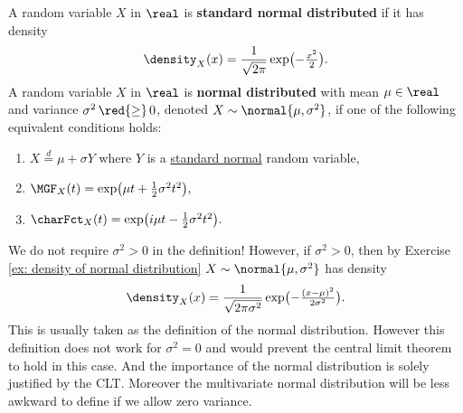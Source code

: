\begin{definition}
    \label{def: univariate normal distribution}
    A random variable \(X\) in \(\real\) is \textbf{standard normal
    distributed} if it has density
    \begin{equation}
        \label{eq: standard normal density}
        \density_X(x)
        = \frac1{\sqrt{2\pi}}
        \exp\bigl(-\tfrac{x^2}{2}\bigr).
    \end{equation}
    A random variable \(X\) in \(\real\) is \textbf{normal
    distributed} with mean \(\mu \in \real\) and variance \(\sigma^2 \mathop{\red{\ge}} 0\),
    denoted \(X \sim \normal{\mu, \sigma^2}\), if one of the following
    equivalent conditions holds:
    \begin{enumerate}[label=(\roman*)]
        \item\label{it: standard normal} \(X \overset{d}= \mu + \sigma Y\) where \(Y\) is a \underline{standard normal} random variable,

        \item\label{it: mgf normal}
        \(
            \MGF_X(t)
            = \exp\bigl(\mu t + \tfrac12 \sigma^2 t^2\bigr),
        \)

        \item\label{it: char fct normal}
        \(
            \charFct_X(t)
            = \exp\bigl(i \mu t - \tfrac12 \sigma^2 t^2\bigr).
        \)
    \end{enumerate}
\end{definition}
\begin{remark}
    We do not require \(\sigma^2 > 0\) in the definition! However, if
    \(\sigma^2>0\), then by Exercise \ref{ex: density of normal distribution} \(X\sim \normal{\mu, \sigma^2}\) has density
    \[
        \density_X(x) = \frac1{\sqrt{2\pi \sigma^2}}
        \exp\bigl(-\tfrac{(x-\mu)^2}{2\sigma^2}\bigr).
    \]
    This is usually taken as the definition of the normal distribution. However
    this definition does not work for \(\sigma^2=0\) and would prevent the
    central limit theorem to hold in this case. And the importance of the normal
    distribution is solely justified by the CLT. Moreover the multivariate normal
    distribution will be less awkward to define if we allow zero variance.
\end{remark}
